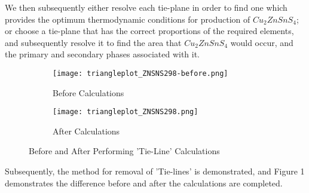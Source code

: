 We then subsequently either resolve each tie-plane in order to find one which provides the optimum thermodynamic conditions for production of $Cu_2ZnSnS_4$; or choose a tie-plane that has the correct proportions of the required elements, and subsequently resolve it to find the area that $Cu_2ZnSnS_4$ would occur, and the primary and secondary phases associated with it.

\begin{figure}
\centering
\begin{subfigure}{80mm}
  \centering
    \texttt{[image: triangleplot\_ZNSNS298-before.png]}
    \caption{Before Calculations}
    \label{fig:ZnSnSBefore}
\end{subfigure}%
\begin{subfigure}{80mm}
 \centering
    \texttt{[image: triangleplot\_ZNSNS298.png]}
    \caption{After Calculations}
    \label{fig:ZnSnS}
\end{subfigure}
\caption{Before and After Performing 'Tie-Line' Calculations}
\label{fig:ZnSnSFigures}
\end{figure}

Subsequently, the method for removal of 'Tie-lines' is demonstrated, and Figure 1 demonstrates the difference before and after the calculations are completed.

